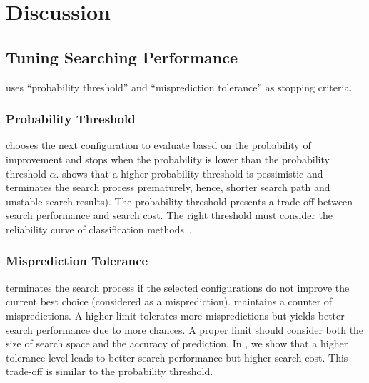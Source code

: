 \section{Discussion}
\label{sec:discussion}


\subsection*{Tuning Searching Performance}

\scout uses ``probability threshold'' and ``misprediction tolerance'' as stopping criteria.

\subsubsection*{Probability Threshold}
\scout chooses the next configuration to evaluate
based on the probability of improvement and
stops when the probability is lower than the probability threshold $\alpha$.
\myfigure{\ref{fig:single_probability_threshold}} shows that
a higher probability threshold is pessimistic and 
terminates the search process prematurely,
hence, shorter search path
and unstable search results). 
The probability threshold presents a trade-off between
search performance and search cost.
The right threshold must consider
the reliability curve of classification methods~\cite{niculescu2005predicting}.

\subsubsection*{Misprediction Tolerance}
\scout terminates the search process if the selected configurations do not improve the current best choice (considered as a misprediction).
\scout maintains a counter of mispredictions.
A higher limit tolerates more mispredictions but yields better search performance due to more chances.
A proper limit should consider both
the size of search space and the accuracy of prediction.
In \myfigure{\ref{fig:single_misprediction_tolerance}},
we show that a higher tolerance level leads to better search performance but higher search cost.
This trade-off is similar to the probability threshold.

